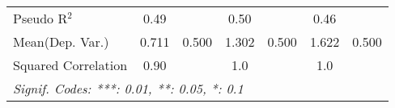 \begin{tabular}{lcccccc}
   Pseudo R$^2$                                               & 0.49          &      & 0.50          &      & 0.46          & \\  
Mean(Dep. Var.) & 0.711 & 0.500 & 1.302 & 0.500 & 1.622 & 0.500 \\
   Squared Correlation                                        & 0.90          &      & 1.0           &      & 1.0           & \\  
   \midrule \midrule
   \multicolumn{7}{l}{\emph{Signif. Codes: ***: 0.01, **: 0.05, *: 0.1}}\\
\end{tabular}
\par\endgroup
